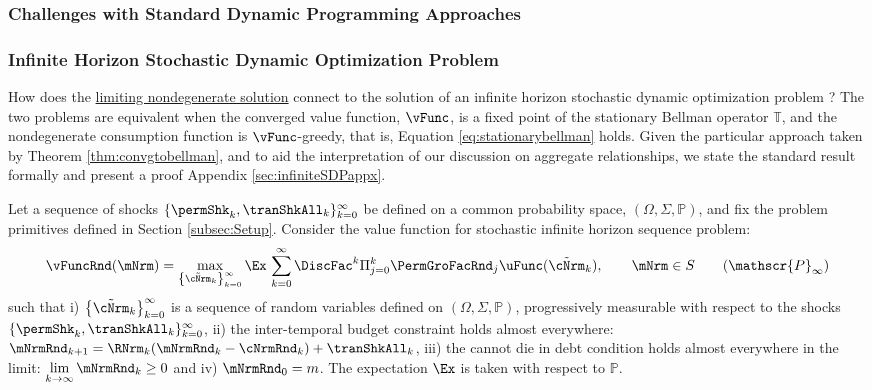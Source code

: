 \documentclass[\econtexRoot/BufferStockTheory]{subfiles}
\begin{document}
\subsubsection{Challenges with Standard Dynamic Programming Approaches}\label{subsubsec:challenges}

\subsubsection{Infinite Horizon Stochastic Dynamic Optimization Problem}\label{subsubsec:infiniteSDPappx}

How does the  \hyperlink{Definition-of-a-Nondegenerate-Solution}{limiting nondegenerate solution} connect to the solution of an infinite horizon stochastic dynamic optimization problem \citep{hlermaSDS1995,puterman1994, stachurski2022}? The two problems are equivalent when the converged value function, $\vFunc$, is a fixed point of the stationary Bellman operator $\mathbb{T}$, and the nondegenerate consumption function is $\vFunc$-greedy, that is,  Equation \eqref{eq:stationarybellman} holds. Given the particular approach taken by Theorem \ref{thm:convgtobellman}, and to aid the interpretation of our discussion on aggregate relationships, we state the standard result formally and present a proof Appendix \ref{sec:infiniteSDPappx}. 

Let a sequence of shocks $\{\permShk_{k},\tranShkAll_{k}\}_{k=0}^{\infty}$ be defined on a common probability space, $(\Omega, \Sigma, \mathbb{P})$, and fix the problem primitives defined in Section \ref{subsec:Setup}. Consider the value function for stochastic infinite horizon sequence problem:
%
\begin{equation}\label{eq:probsequence}
\vFuncRnd(\mNrm) = \max_{\left\{\tilde{\cNrm}_{k}\right\}_{k=0}^{\infty}} \Ex\,\sum_{k=0}^{\infty}\DiscFac^{k}\Pi_{j=0}^{k}\PermGroFacRnd_{j}\uFunc(\tilde{\cNrm}_{k}), \qquad \mNrm\in S \tag{$\mathscr{P}_{\infty}$}
\end{equation}
%
%
such that i) $\left\{\tilde{\cNrm}_{k}\right\}_{k=0}^{\infty}$ is a sequence of random variables defined on $(\Omega, \Sigma, \mathbb{P})$, progressively measurable with respect to the shocks $\{\permShk_{k},\tranShkAll_{k}\}_{k=0}^{\infty}$, ii) the inter-temporal budget constraint holds almost everywhere: $\mNrmRnd_{k+1} = \RNrm_{k}(\mNrmRnd_{k} - \cNrmRnd_{k}) + \tranShkAll_{k}$, iii) the cannot die in debt condition holds almost everywhere in the limit: $\lim\limits_{k\rightarrow \infty}{\mNrmRnd_{k}}\geq 0$ and iv) $\mNrmRnd_{0} = m$. The expectation $\Ex$ is taken with respect to $\mathbb{P}$. 
\end{document}

